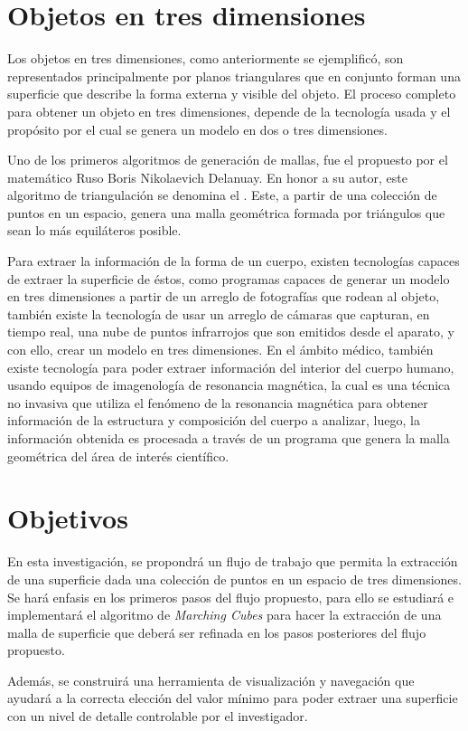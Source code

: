 \section{Objetos en tres dimensiones}
\label{sec:objectosEnTresDimensiones}
Los objetos en tres dimensiones, como anteriormente se ejemplificó, son representados
principalmente por planos triangulares que en conjunto forman una superficie que describe la
forma externa y visible del objeto. El proceso completo para obtener un objeto en tres dimensiones, depende de la tecnología usada y el propósito por el cual se genera un modelo en
dos o tres dimensiones.

Uno de los primeros algoritmos de generación de mallas, fue el propuesto por el
matemático Ruso Boris Nikolaevich Delanuay\cite{Delaunay1934}. En honor a su autor, este algoritmo de
triangulación se denomina el . Este, a partir de
una colección de puntos en un espacio, genera una malla geométrica formada por triángulos que
sean lo más equiláteros posible.

Para extraer la información de la forma de un cuerpo, existen tecnologías capaces de
extraer la superficie de éstos, como programas capaces de generar un modelo en tres
dimensiones a partir de un arreglo de fotografías que rodean al objeto, también existe la
tecnología de usar un arreglo de cámaras que capturan, en tiempo real, una nube de puntos
infrarrojos que son emitidos desde el aparato, y con ello, crear un modelo en tres dimensiones. En
el ámbito médico, también existe tecnología para poder extraer información del interior del
cuerpo humano, usando equipos de imagenología de resonancia magnética, la cual es una técnica
no invasiva que utiliza el fenómeno de la resonancia magnética para obtener información de la
estructura y composición del cuerpo a analizar, luego, la información obtenida es procesada a
través de un programa que genera la malla geométrica del área de interés científico.

\section{Objetivos}
\label{sec:objetivos}
En esta investigación, se propondrá un flujo de trabajo que permita la extracción de una superficie dada una colección de puntos en un espacio de tres dimensiones. Se hará enfasis en los primeros pasos del flujo propuesto, para ello se estudiará e implementará el algoritmo de \emph{Marching Cubes} para hacer la extracción de una malla de superficie que deberá ser refinada en los pasos posteriores del flujo propuesto.

Además, se construirá una herramienta de visualización y navegación que ayudará a la correcta elección del valor mínimo para poder extraer una superficie con un nivel de detalle controlable por el investigador.